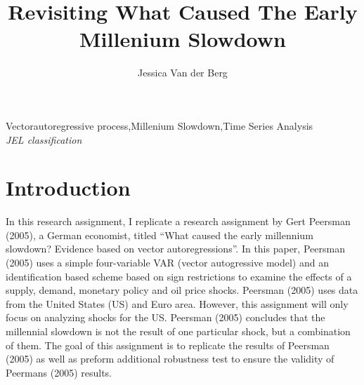 \documentclass[11pt,preprint, authoryear]{elsarticle}
\numberwithin{equation}{section}
\numberwithin{figure}{section}
\numberwithin{table}{section}
\begin{document}
\begin{frontmatter}  %

\title{Revisiting What Caused The Early Millenium Slowdown}





\author[Add1]{Jessica Van der Berg}





\address[Add1]{20190565}



\vspace{1cm}

\begin{keyword}
\footnotesize{
Vectorautoregressive process\sep Millenium Slowdown\sep Time Series
Analysis \\ \vspace{0.3cm}
\textit{JEL classification} 
}
\end{keyword}
\vspace{0.5cm}
\end{frontmatter}



\pagestyle{fancy}
\chead{}
\lfoot{}
\lhead{}
\cfoot{}


\headsep 35pt %




\hypertarget{introduction}{%
\section{Introduction}\label{introduction}}

In this research assignment, I replicate a research assignment by Gert
Peersman (2005), a German economist, titled ``What caused the early
millennium slowdown? Evidence based on vector autoregressions''. In this
paper, Peersman (2005) uses a simple four-variable VAR (vector
autogressive model) and an identification based scheme based on sign
restrictions to examine the effects of a supply, demand, monetary policy
and oil price shocks. Peersman (2005) uses data from the United States
(US) and Euro area. However, this assignment will only focus on
analyzing shocks for the US. Peersman (2005) concludes that the
millennial slowdown is not the result of one particular shock, but a
combination of them. The goal of this assignment is to replicate the
results of Peersman (2005) as well as preform additional robustness test
to ensure the validity of Peermans (2005) results.
\end{document}
